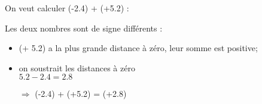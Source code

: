 \begin{myexs}
	
		
		On veut calculer (-\num{2.4}) + (+\num{5.2}) :
		
		Les deux nombres sont de signe différents :
		\begin{itemize}
			\item (+ \num{5.2}) a la plus grande distance à zéro, leur somme est positive;
			\item on soustrait les distances à zéro \\ $\num{5.2} - \num{2.4} = \num{2.8}$
			\item[$\Rightarrow$] (-\num{2.4}) + (+\num{5.2}) = (+\num{2.8})
		\end{itemize} 
		
		\vspace*{1cm}
		
		
		\iftoggle{eleve}{%
		
			On veut calculer (-\num{4.6}) + (+\num{3.7}) :
			
			\hrulefill
			\begin{itemize}
				\item \hrulefill
				
				\vspace*{0.2cm}
				
				\hrulefill
				\item \hrulefill \\ \hrulefill
				\item[$\Rightarrow$] \hrulefill
			\end{itemize} 
		}{%
			On veut calculer (-\num{4.6}) + (+\num{3.7}) :
			
			Les deux nombres sont de signe différents :
			\begin{itemize}
				\item (- \num{4.6}) a la plus grande distance à zéro, leur somme est négative;
				\item on soustrait les distances à zéro \\ $\num{4.6} - \num{3.7} = \num{0.9}$
				\item[$\Rightarrow$] (-\num{4.6}) + (-\num{3.7}) = (-\num{8.3})
			\end{itemize} 
		}
\end{myexs}




